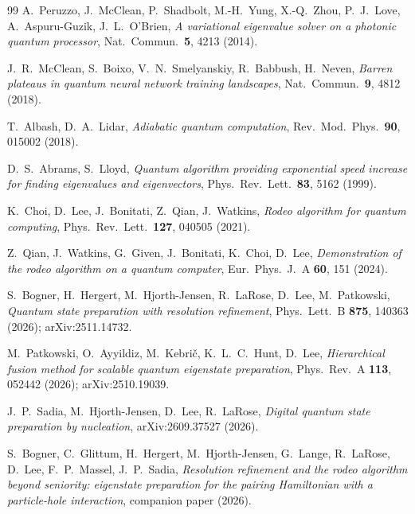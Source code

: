 \documentclass[
  aps,            %
  prc,            %
  reprint,        %
  superscriptaddress,
  floatfix,
  nofootinbib
]{revtex4-2}
\begin{document}
\begin{thebibliography}{99}
A.~Peruzzo, J.~McClean, P.~Shadbolt, M.-H.~Yung, X.-Q.~Zhou, P.~J.~Love,
A.~Aspuru-Guzik, J.~L.~O'Brien,
\textit{A variational eigenvalue solver on a photonic quantum processor},
Nat.\ Commun.\ \textbf{5}, 4213 (2014).

J.~R.~McClean, S.~Boixo, V.~N.~Smelyanskiy, R.~Babbush, H.~Neven,
\textit{Barren plateaus in quantum neural network training landscapes},
Nat.\ Commun.\ \textbf{9}, 4812 (2018).

T.~Albash, D.~A.~Lidar,
\textit{Adiabatic quantum computation},
Rev.\ Mod.\ Phys.\ \textbf{90}, 015002 (2018).

D.~S.~Abrams, S.~Lloyd,
\textit{Quantum algorithm providing exponential speed increase for finding
eigenvalues and eigenvectors},
Phys.\ Rev.\ Lett.\ \textbf{83}, 5162 (1999).

K.~Choi, D.~Lee, J.~Bonitati, Z.~Qian, J.~Watkins,
\textit{Rodeo algorithm for quantum computing},
Phys.\ Rev.\ Lett.\ \textbf{127}, 040505 (2021).

Z.~Qian, J.~Watkins, G.~Given, J.~Bonitati, K.~Choi, D.~Lee,
\textit{Demonstration of the rodeo algorithm on a quantum computer},
Eur.\ Phys.\ J.\ A \textbf{60}, 151 (2024).

S.~Bogner, H.~Hergert, M.~Hjorth-Jensen, R.~LaRose, D.~Lee, M.~Patkowski,
\textit{Quantum state preparation with resolution refinement},
Phys.\ Lett.\ B \textbf{875}, 140363 (2026); arXiv:2511.14732.

M.~Patkowski, O.~Ayyildiz, M.~Kebri\v{c}, K.~L.~C.~Hunt, D.~Lee,
\textit{Hierarchical fusion method for scalable quantum eigenstate preparation},
Phys.\ Rev.\ A \textbf{113}, 052442 (2026); arXiv:2510.19039.

J.~P.~Sadia, M.~Hjorth-Jensen, D.~Lee, R.~LaRose,
\textit{Digital quantum state preparation by nucleation},
arXiv:2609.37527 (2026).

S.~Bogner, C.~Glittum, H.~Hergert, M.~Hjorth-Jensen, G.~Lange, R.~LaRose,
D.~Lee, F.~P.~Massel, J.~P.~Sadia,
\textit{Resolution refinement and the rodeo algorithm beyond seniority:
eigenstate preparation for the pairing Hamiltonian with a particle-hole
interaction},
companion paper (2026).


\end{thebibliography}
\end{document}
